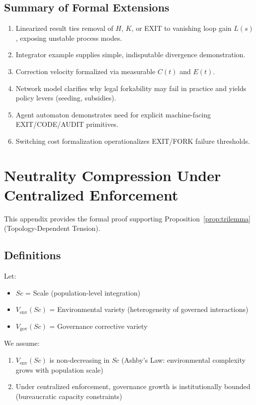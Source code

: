 \documentclass{article}
\begin{document}
\subsection{Summary of Formal Extensions}

\begin{enumerate}
    \item Linearized result ties removal of $H$, $K$, or EXIT to vanishing loop gain $L(s)$, exposing unstable process modes.
    \item Integrator example supplies simple, indisputable divergence demonstration.
    \item Correction velocity formalized via measurable $C(t)$ and $E(t)$.
    \item Network model clarifies why legal forkability may fail in practice and yields policy levers (seeding, subsidies).
    \item Agent automaton demonstrates need for explicit machine-facing EXIT/CODE/AUDIT primitives.
    \item Switching cost formalization operationalizes EXIT/FORK failure thresholds.
\end{enumerate}

\section{Neutrality Compression Under Centralized Enforcement}
\label{appendix:neutrality}

This appendix provides the formal proof supporting Proposition~\ref{prop:trilemma} (Topology-Dependent Tension).

\subsection{Definitions}

Let:
\begin{itemize}[noitemsep]
    \item $Sc$ = Scale (population-level integration)
    \item $V_{\text{env}}(Sc)$ = Environmental variety (heterogeneity of governed interactions)
    \item $V_{\text{gov}}(Sc)$ = Governance corrective variety
\end{itemize}

We assume:
\begin{enumerate}[noitemsep]
    \item $V_{\text{env}}(Sc)$ is non-decreasing in $Sc$ (Ashby's Law: environmental complexity grows with population scale)
    \item Under centralized enforcement, governance growth is institutionally bounded (bureaucratic capacity constraints)
\end{enumerate}
\end{document}
